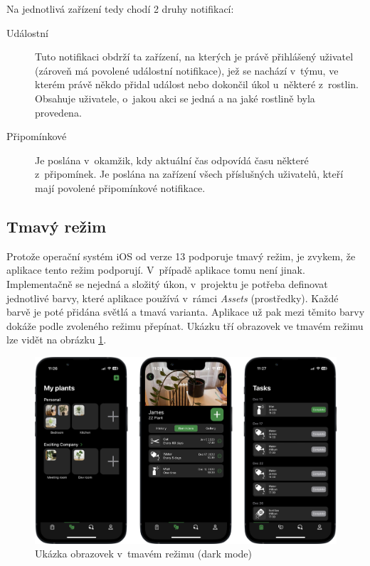 \documentclass[thesis=M,czech]{FITthesis}[2019/12/23]
\begin{document}
Na jednotlivá zařízení tedy chodí 2 druhy notifikací:

\begin{description}
    \item[Událostní] Tuto notifikaci obdrží ta zařízení, na kterých je právě přihlášený uživatel (zároveň má povolené událostní notifikace), jež se nachází v~týmu, ve kterém právě někdo přidal událost nebo dokončil úkol u~některé z~rostlin. Obsahuje uživatele, o~jakou akci se jedná a na jaké rostlině byla provedena.
    \item[Připomínkové] Je poslána v~okamžik, kdy aktuální čas odpovídá času některé z~připomínek. Je poslána na zařízení všech příslušných uživatelů, kteří mají povolené připomínkové notifikace.
\end{description}

\subsection{Tmavý režim}
Protože operační systém iOS od verze 13 podporuje tmavý režim, je zvykem, že aplikace tento režim podporují. V~případě aplikace  tomu není jinak. Implementačně se nejedná a složitý úkon, v~projektu je potřeba definovat jednotlivé barvy, které aplikace používá v~rámci \textit{Assets} (prostředky). Každé barvě je poté přidána světlá a tmavá varianta. Aplikace už pak mezi těmito barvy dokáže podle zvoleného režimu přepínat. Ukázku tří obrazovek ve tmavém režimu lze vidět na obrázku \ref{img:screenshots-dark-mode}.

\begin{figure}[H]
	\centering
	\includegraphics[width=1\linewidth]{images/screenshots-dark-mode.png}
  	\caption{Ukázka obrazovek v~tmavém režimu (dark mode)}
  	\label{img:screenshots-dark-mode}
\end{figure}
\end{document}
